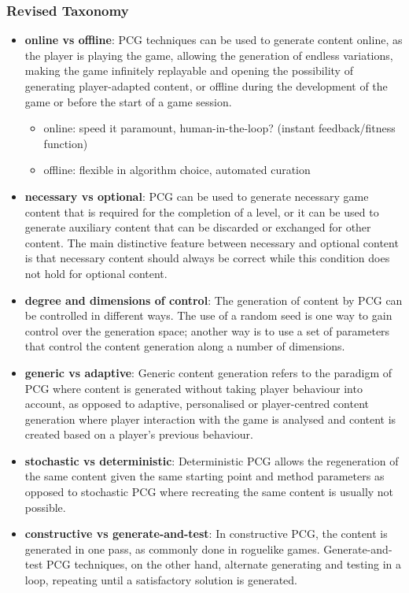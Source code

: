 \documentclass[MGS,Master,english]{twbook}%
\begin{document}
\subsubsection{Revised Taxonomy}
\cite{pcg::book} 
\begin{itemize}
	\item \textbf{online vs offline}: PCG techniques can be used to generate content online, as the player is playing the	game, allowing the generation of endless variations, making the game infinitely replayable and opening the possibility of generating player-adapted content, or offline during the development of the game or before the start of a game session.
	\begin{itemize}
		\item online: speed it paramount, human-in-the-loop? (instant feedback/fitness function)
		\item offline: flexible in algorithm choice, automated curation
	\end{itemize}
	\item \textbf{necessary vs optional}: PCG can be used to generate necessary game content that is required for the completion of a level, or it can be used to generate auxiliary content that can be discarded or  exchanged for other content. The main distinctive feature between necessary and optional content is that necessary content should always be correct while this condition does not hold for optional content.
	\item \textbf{degree and dimensions of control}: The generation of content by PCG can be controlled in different ways. The use of a random seed is one way to gain control over the generation space; another way is to use a set of parameters that control the content generation along a number of dimensions.
	\item \textbf{generic vs adaptive}: Generic content generation refers to the paradigm of PCG where content is generated without taking player behaviour into account, as opposed to adaptive, personalised or player-centred content generation where player interaction with the game is analysed and content is created based on a player’s previous behaviour.
	\item \textbf{stochastic vs deterministic}: Deterministic PCG allows the regeneration of the same content given the same starting point and method parameters as opposed to stochastic PCG where recreating the same content is usually not possible.
	\item \textbf{constructive vs generate-and-test}: In constructive PCG, the content is generated in one pass, as commonly done in roguelike games. Generate-and-test PCG techniques, on the other hand, alternate generating and testing in a loop, repeating until a satisfactory solution is generated.

\end{itemize}
\end{document}
